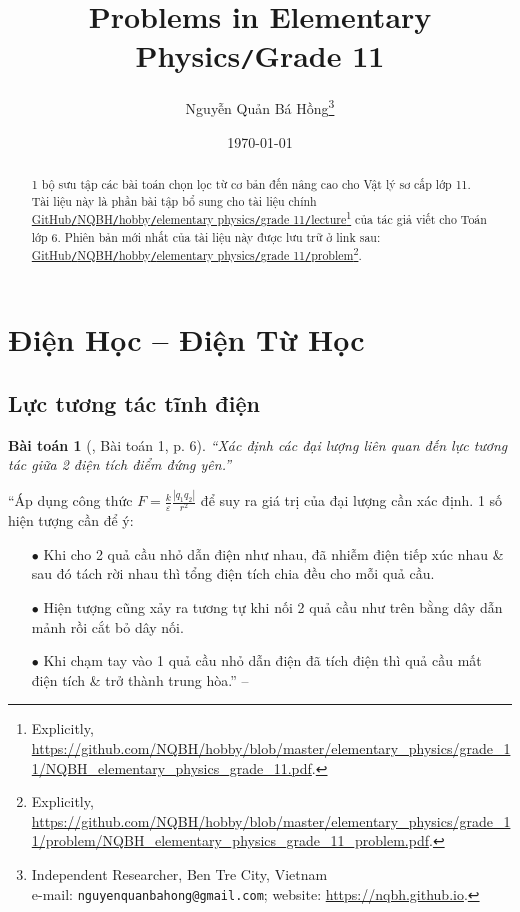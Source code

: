 \documentclass{article}
\title{Problems in Elementary Physics\texttt{/}Grade 11}
\author{Nguyễn Quản Bá Hồng\footnote{Independent Researcher, Ben Tre City, Vietnam\\e-mail: \texttt{nguyenquanbahong@gmail.com}; website: \url{https://nqbh.github.io}.}}
\date{\today}
\numberwithin{equation}{section}
\newtheorem{baitoan}{Bài toán}[section]
\begin{document}
\maketitle
\begin{abstract}
	1 bộ sưu tập các bài toán chọn lọc từ cơ bản đến nâng cao cho Vật lý sơ cấp lớp 11. Tài liệu này là phần bài tập bổ sung cho tài liệu chính \href{https://github.com/NQBH/hobby/blob/master/elementary_physics/grade_11/NQBH_elementary_physics_grade_11.pdf}{GitHub\texttt{/}NQBH\texttt{/}hobby\texttt{/}elementary physics\texttt{/}grade 11\texttt{/}lecture}\footnote{Explicitly, \url{https://github.com/NQBH/hobby/blob/master/elementary_physics/grade_11/NQBH_elementary_physics_grade_11.pdf}.} của tác giả viết cho Toán lớp 6. Phiên bản mới nhất của tài liệu này được lưu trữ ở link sau: \href{https://github.com/NQBH/hobby/blob/master/elementary_physics/grade_11/problem/NQBH_elementary_physics_grade_11_problem.pdf}{GitHub\texttt{/}NQBH\texttt{/}hobby\texttt{/}elementary physics\texttt{/}grade 11\texttt{/}problem}\footnote{Explicitly, \url{https://github.com/NQBH/hobby/blob/master/elementary_physics/grade_11/problem/NQBH_elementary_physics_grade_11_problem.pdf}.}.
\end{abstract}
\tableofcontents
\newpage

\section{Điện Học -- Điện Từ Học}

\subsection{Lực tương tác tĩnh điện}

\begin{baitoan}[\cite{Giai_Toan_Vat_Ly_11_tap_1}, Bài toán 1, p. 6]
	``Xác định các đại lượng liên quan đến lực tương tác giữa 2 điện tích điểm đứng yên.''
\end{baitoan}
``Áp dụng công thức $F = \frac{k}{\varepsilon}\frac{|q_1q_2|}{r^2}$ để suy ra giá trị của đại lượng cần xác định. 1 số hiện tượng cần để ý:
\begin{enumerate}
	\item[$\bullet$] Khi cho 2 quả cầu nhỏ dẫn điện như nhau, đã nhiễm điện tiếp xúc nhau \& sau đó tách rời nhau thì tổng điện tích chia đều cho mỗi quả cầu.
	\item[$\bullet$] Hiện tượng cũng xảy ra tương tự khi nối 2 quả cầu như trên bằng dây dẫn mảnh rồi cắt bỏ dây nối.
	\item[$\bullet$] Khi chạm tay vào 1 quả cầu nhỏ dẫn điện đã tích điện thì quả cầu mất điện tích \& trở thành trung hòa.'' -- \cite[p. 7]{Giai_Toan_Vat_Ly_11_tap_1}
\end{enumerate}
\end{document}
